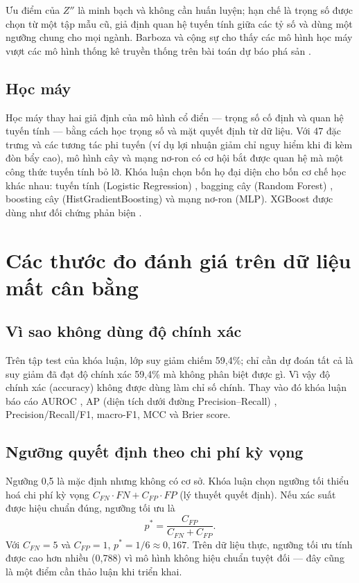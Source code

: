 Ưu điểm của $Z''$ là minh bạch và không cần huấn luyện; hạn chế là trọng số được chọn từ một tập
mẫu cũ, giả định quan hệ tuyến tính giữa các tỷ số và dùng một ngưỡng chung cho mọi ngành.
Barboza và cộng sự cho thấy các mô hình học máy vượt các mô hình thống kê truyền thống trên bài
toán dự báo phá sản \cite{barboza2017}.

\subsection{Học máy}

Học máy thay hai giả định của mô hình cổ điển — trọng số cố định và quan hệ tuyến tính — bằng cách
học trọng số và mặt quyết định từ dữ liệu. Với 47 đặc trưng và các tương tác phi tuyến (ví dụ lợi
nhuận giảm chỉ nguy hiểm khi đi kèm đòn bẩy cao), mô hình cây và mạng nơ-ron có cơ hội bắt được
quan hệ mà một công thức tuyến tính bỏ lỡ. Khóa luận chọn bốn họ đại diện cho bốn cơ chế học khác
nhau: tuyến tính (Logistic Regression) \cite{pedregosa2011}, bagging cây (Random Forest)
\cite{breiman2001}, boosting cây (HistGradientBoosting) \cite{friedman2001} và mạng nơ-ron
(MLP). XGBoost được dùng như đối chứng phản biện \cite{chen2016}.

\section{Các thước đo đánh giá trên dữ liệu mất cân bằng}

\subsection{Vì sao không dùng độ chính xác}

Trên tập test của khóa luận, lớp suy giảm chiếm 59,4\%; chỉ cần dự đoán tất cả là suy giảm đã đạt
độ chính xác 59,4\% mà không phân biệt được gì. Vì vậy độ chính xác (accuracy) không được dùng làm
chỉ số chính. Thay vào đó khóa luận báo cáo AUROC \cite{fawcett2006}, AP (diện tích dưới đường
Precision--Recall) \cite{davis2006}, Precision/Recall/F1, macro-F1, MCC và Brier score.

\subsection{Ngưỡng quyết định theo chi phí kỳ vọng}

Ngưỡng 0,5 là mặc định nhưng không có cơ sở. Khóa luận chọn ngưỡng tối thiểu hoá chi phí kỳ vọng
$C_{FN}\cdot FN + C_{FP}\cdot FP$ (lý thuyết quyết định). Nếu xác suất được hiệu chuẩn đúng, ngưỡng
tối ưu là
\begin{equation}
p^{*} = \frac{C_{FP}}{C_{FN} + C_{FP}}.
\end{equation}
Với $C_{FN} = 5$ và $C_{FP} = 1$, $p^{*} = 1/6 \approx 0{,}167$. Trên dữ liệu thực, ngưỡng tối ưu
tính được cao hơn nhiều (0,788) vì mô hình không hiệu chuẩn tuyệt đối — đây cũng là một điểm cần
thảo luận khi triển khai.
